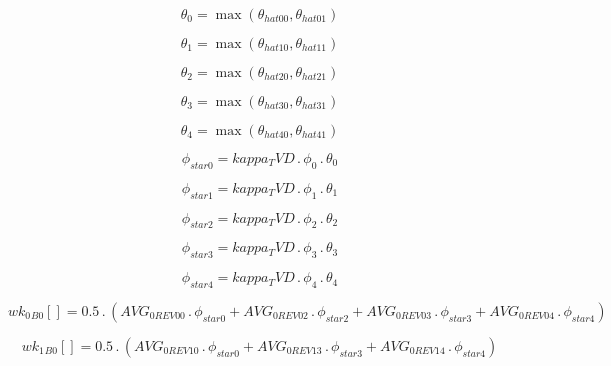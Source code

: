\documentclass{article}
\begin{document}
\begin{dmath}\theta_{0} = \max\left(\theta_{hat 00}, \theta_{hat 01}\right)\end{dmath}

\begin{dmath}\theta_{1} = \max\left(\theta_{hat 10}, \theta_{hat 11}\right)\end{dmath}

\begin{dmath}\theta_{2} = \max\left(\theta_{hat 20}, \theta_{hat 21}\right)\end{dmath}

\begin{dmath}\theta_{3} = \max\left(\theta_{hat 30}, \theta_{hat 31}\right)\end{dmath}

\begin{dmath}\theta_{4} = \max\left(\theta_{hat 40}, \theta_{hat 41}\right)\end{dmath}

\begin{dmath}\phi_{star 0} = kappa_TVD \,.\, \phi_{0} \,.\, \theta_{0}\end{dmath}

\begin{dmath}\phi_{star 1} = kappa_TVD \,.\, \phi_{1} \,.\, \theta_{1}\end{dmath}

\begin{dmath}\phi_{star 2} = kappa_TVD \,.\, \phi_{2} \,.\, \theta_{2}\end{dmath}

\begin{dmath}\phi_{star 3} = kappa_TVD \,.\, \phi_{3} \,.\, \theta_{3}\end{dmath}

\begin{dmath}\phi_{star 4} = kappa_TVD \,.\, \phi_{4} \,.\, \theta_{4}\end{dmath}

\begin{dmath}{wk_{0}{_{B0}}}[{}] = 0.5 \,.\, \left(AVG_{0 REV 00} \,.\, \phi_{star 0} + AVG_{0 REV 02} \,.\, \phi_{star 2} + AVG_{0 REV 03} \,.\, \phi_{star 3} + AVG_{0 REV 04} \,.\, \phi_{star 4}\right)\end{dmath}

\begin{dmath}{wk_{1}{_{B0}}}[{}] = 0.5 \,.\, \left(AVG_{0 REV 10} \,.\, \phi_{star 0} + AVG_{0 REV 13} \,.\, \phi_{star 3} + AVG_{0 REV 14} \,.\, \phi_{star 4}\right)\end{dmath}
\end{document}
